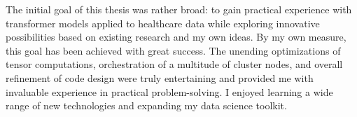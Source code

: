 The initial goal of this thesis was rather broad: to gain practical experience with transformer models applied to healthcare data while exploring innovative possibilities based on existing research and my own ideas. By my own measure, this goal has been achieved with great success. The unending optimizations of tensor computations, orchestration of a multitude of cluster nodes, and overall refinement of code design were truly entertaining and provided me with invaluable experience in practical problem-solving. I enjoyed learning a wide range of new technologies and expanding my data science toolkit.
